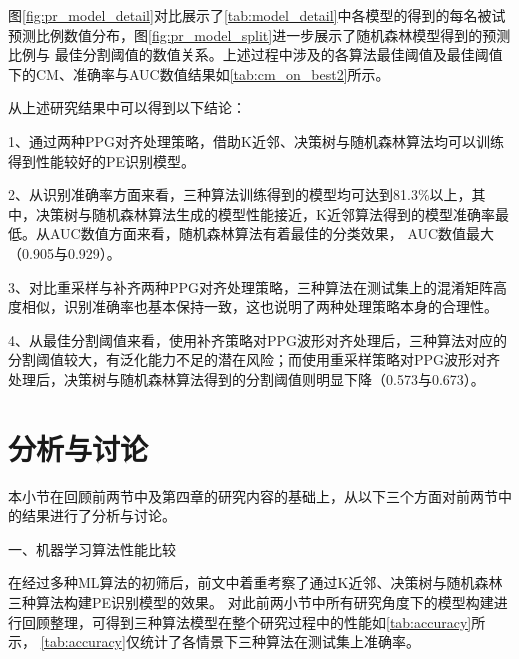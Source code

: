 图\autoref{fig:pr_model_detail}对比展示了\autoref{tab:model_detail}中各模型的得到的每名被试预测比例数值分布，图\autoref{fig:pr_model_split}进一步展示了随机森林模型得到的预测比例与
最佳分割阈值的数值关系。上述过程中涉及的各算法最佳阈值及最佳阈值下的CM、准确率与AUC数值结果如\autoref{tab:cm_on_best2}所示。

从上述研究结果中可以得到以下结论：

1、通过两种PPG对齐处理策略，借助K近邻、决策树与随机森林算法均可以训练得到性能较好的PE识别模型。

2、从识别准确率方面来看，三种算法训练得到的模型均可达到81.3\%以上，其中，决策树与随机森林算法生成的模型性能接近，K近邻算法得到的模型准确率最低。从AUC数值方面来看，随机森林算法有着最佳的分类效果，
AUC数值最大（0.905与0.929）。

3、对比重采样与补齐两种PPG对齐处理策略，三种算法在测试集上的混淆矩阵高度相似，识别准确率也基本保持一致，这也说明了两种处理策略本身的合理性。

4、从最佳分割阈值来看，使用补齐策略对PPG波形对齐处理后，三种算法对应的分割阈值较大，有泛化能力不足的潜在风险；而使用重采样策略对PPG波形对齐处理后，决策树与随机森林算法得到的分割阈值则明显下降（0.573与0.673）。

\section{分析与讨论}
本小节在回顾前两节中及第四章的研究内容的基础上，从以下三个方面对前两节中的结果进行了分析与讨论。

一、机器学习算法性能比较

在经过多种ML算法的初筛后，前文中着重考察了通过K近邻、决策树与随机森林三种算法构建PE识别模型的效果。
对此前两小节中所有研究角度下的模型构建进行回顾整理，可得到三种算法模型在整个研究过程中的性能如\autoref{tab:accuracy}所示，
\autoref{tab:accuracy}仅统计了各情景下三种算法在测试集上准确率。

